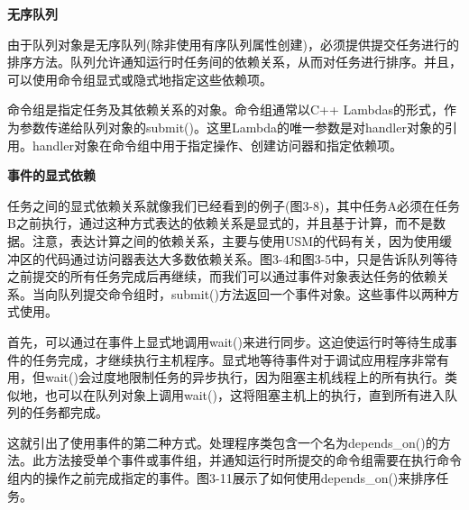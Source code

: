 \hspace*{\fill} \par %
\textbf{无序队列}

由于队列对象是无序队列(除非使用有序队列属性创建)，必须提供提交任务进行的排序方法。队列允许通知运行时任务间的依赖关系，从而对任务进行排序。并且，可以使用命令组显式或隐式地指定这些依赖项。\par

命令组是指定任务及其依赖关系的对象。命令组通常以C++ Lambdas的形式，作为参数传递给队列对象的submit()。这里Lambda的唯一参数是对handler对象的引用。handler对象在命令组中用于指定操作、创建访问器和指定依赖项。\par

\hspace*{\fill} \par %
\textbf{事件的显式依赖}

任务之间的显式依赖关系就像我们已经看到的例子(图3-8)，其中任务A必须在任务B之前执行，通过这种方式表达的依赖关系是显式的，并且基于计算，而不是数据。注意，表达计算之间的依赖关系，主要与使用USM的代码有关，因为使用缓冲区的代码通过访问器表达大多数依赖关系。图3-4和图3-5中，只是告诉队列等待之前提交的所有任务完成后再继续，而我们可以通过事件对象表达任务的依赖关系。当向队列提交命令组时，submit()方法返回一个事件对象。这些事件以两种方式使用。\par

首先，可以通过在事件上显式地调用wait()来进行同步。这迫使运行时等待生成事件的任务完成，才继续执行主机程序。显式地等待事件对于调试应用程序非常有用，但wait()会过度地限制任务的异步执行，因为阻塞主机线程上的所有执行。类似地，也可以在队列对象上调用wait()，这将阻塞主机上的执行，直到所有进入队列的任务都完成。\par

这就引出了使用事件的第二种方式。处理程序类包含一个名为depends\_on()的方法。此方法接受单个事件或事件组，并通知运行时所提交的命令组需要在执行命令组内的操作之前完成指定的事件。图3-11展示了如何使用depends\_on()来排序任务。\par

